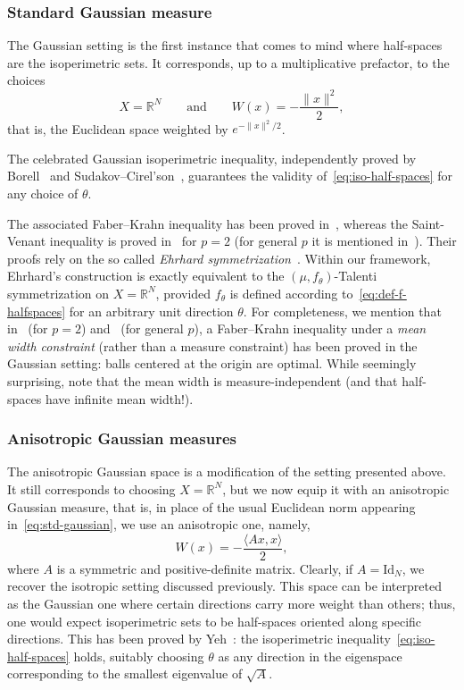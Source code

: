 \documentclass[a4paper,12pt,reqno]{amsart}
\numberwithin{equation}{section}
\newcommand{\Rn}{\mathbb{R}^N}
\theoremstyle{plain}
\theoremstyle{definition}
\begin{document}
\subsubsection{Standard Gaussian measure}
\label{sec:gaussian}

The Gaussian setting is the first instance that comes to mind where half-spaces are the isoperimetric sets. It corresponds, up to a multiplicative prefactor, to the choices
%
\begin{equation}
\label{eq:std-gaussian}
X=\Rn
\qquad\text{and}\qquad 
W(x) = -\frac{\|x\|^2}{2},
\end{equation}
%
that is, the Euclidean space weighted by $e^{-\|x\|^2/2}$.

The celebrated Gaussian isoperimetric inequality, independently proved by Borell~\cite{Bor75} and Sudakov--Cirel'son~\cite{SC74}, guarantees the validity of~\eqref{eq:iso-half-spaces} for any choice of $\theta$.

The associated Faber--Krahn inequality has been proved in~\cite[Thm.~4.7]{Ehr84}, whereas the Saint-Venant inequality is proved in~\cite[Prop.~5.6]{Liv24} for $p=2$ (for general $p$ it is mentioned in~\cite[Thm.~2.3]{CFMW26}). Their proofs rely on the so called \emph{Ehrhard symmetrization}~\cite{Ehr83}. Within our framework, Ehrhard's construction is exactly equivalent to the $(\mu,f_\theta)$-Talenti symmetrization on $X=\Rn$, provided $f_\theta$ is defined according to~\eqref{eq:def-f-halfspaces} for an arbitrary unit direction $\theta$. For completeness, we mention that in~\cite[Cor.~1.5]{CFLS-in-press} (for $p=2$) and~\cite[Cor.~1.4]{CQS26} (for general $p$), a Faber--Krahn inequality under a  \emph{mean width constraint} (rather than a measure constraint) has been proved in the Gaussian setting: balls centered at the origin are optimal.  While seemingly surprising, note that the mean width is measure-independent (and that half-spaces have infinite mean width!).

\subsubsection{Anisotropic Gaussian measures}
\label{sec:gauss-ani}

The anisotropic Gaussian space is a modification of the setting presented above. It still corresponds to choosing $X=\Rn$, but we now equip it with an anisotropic Gaussian measure, that is, in place of the usual Euclidean norm appearing in~\eqref{eq:std-gaussian}, we use an anisotropic one, namely,
%
\[
W(x)=-\frac{\langle Ax,x\rangle}{2},
\]
%
where $A$ is a symmetric and positive-definite matrix. Clearly, if $A=\mathrm{Id}_N$, we recover the isotropic setting discussed previously. This space can be interpreted as the Gaussian one where certain directions carry more weight than others; thus, one would expect isoperimetric sets to be half-spaces oriented along specific directions. This has been proved by Yeh~\cite[Thm.~1.1]{Yeh24}: the isoperimetric inequality~\eqref{eq:iso-half-spaces} holds, suitably choosing $\theta$ as any direction in the eigenspace corresponding to the smallest eigenvalue of $\sqrt{A}$.
\end{document}
